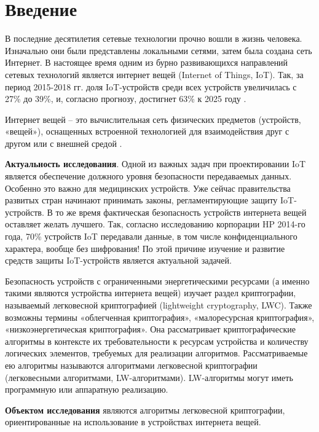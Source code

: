 \chapter*{Введение} %

В последние десятилетия сетевые технологии прочно вошли в жизнь человека. Изначально они были представлены локальными сетями, затем была создана сеть Интернет. В настоящее время одним из бурно развивающихся направлений сетевых технологий является интернет вещей (Internet of Things, IoT). Так, за период 2015-2018 гг. доля IoT-устройств среди всех устройств увеличилась с 27\% до 39\%, и, согласно прогнозу, достигнет 63\% к 2025 году \cite{src1}. 

Интернет вещей – это вычислительная сеть физических предметов (устройств, «вещей»), оснащенных встроенной технологией для взаимодействия друг с другом или с внешней средой \cite{src2}.

\textbf{Актуальность исследования}. Одной из важных задач при проектировании IoT является обеспечение должного уровня безопасности передаваемых данных. Особенно это важно для медицинских устройств\cite{src3}. Уже сейчас правительства развитых стран начинают принимать законы, регламентирующие защиту IoT-устройств\cite{src4}\cite{src5}\cite{src6}. В то же время фактическая безопасность устройств интернета вещей оставляет желать лучшего. Так, согласно исследованию корпорации HP 2014-го года, 70\% устройств IoT передавали данные, в том числе конфиденциального характера, вообще без шифрования\cite{src7}! По этой причине изучение и развитие средств защиты IoT-устройств является актуальной задачей.

Безопасность устройств с ограниченными энергетическими ресурсами (а именно такими являются устройства интернета вещей) изучает раздел криптографии, называемый легковесной криптографией (lightweight cryptography, LWC). Также возможны термины «облегченная криптография», «малоресурсная криптография», «низкоэнергетическая криптография». Она рассматривает криптографические алгоритмы в контексте их требовательности к ресурсам устройства и количеству логических элементов, требуемых для реализации алгоритмов. Рассматриваемые ею алгоритмы называются алгоритмами легковесной криптографии (легковесными алгоритмами, LW-алгоритмами). LW-алгоритмы могут иметь программную или аппаратную реализацию.

\textbf{Объектом исследования} являются алгоритмы легковесной криптографии, ориентированные на использование в устройствах интернета вещей.


